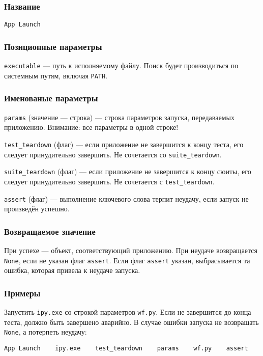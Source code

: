\documentclass[11pt]{book} %
\begin{document}
\subsubsection*{Название} 
\verb"App Launch"

\subsubsection*{Позиционные параметры} 

\verb"executable" --- путь к исполняемому файлу. Поиск будет производиться по системным путям, включая \verb"PATH".

\subsubsection*{Именованые параметры} 
\verb"params" (значение --- строка) --- строка параметров запуска, передаваемых приложению. Внимание: все параметры в одной строке!

\verb"test_teardown" (флаг) --- если приложение не завершится к концу теста, его следует принудительно завершить. Не сочетается со \verb"suite_teardown".

\verb"suite_teardown" (флаг) --- если приложение не завершится к концу сюиты, его следует принудительно завершить. Не сочетается с \verb"test_teardown".

\verb"assert" (флаг) --- выполнение ключевого слова терпит неудачу, если запуск не произведён успешно.

\subsubsection*{Возвращаемое значение} 
При успехе --- объект, соответствующий приложению. При неудаче возвращается \verb"None", если не указан флаг \verb"assert". Если флаг \verb"assert" указан, выбрасывается та ошибка, которая привела к неудаче запуска.

\subsubsection*{Примеры}
Запустить \verb"ipy.exe" со строкой параметров \verb"wf.py". Если не завершится до конца теста, должно быть завершено аварийно. В случае ошибки запуска не возвращать \verb"None", а потерпеть неудачу:

\begin{verbatim}App Launch    ipy.exe    test_teardown    params    wf.py    assert\end{verbatim}
\end{document}
